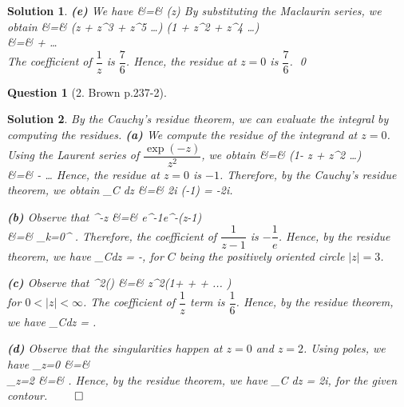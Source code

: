 \documentclass{article} %
\def\eQb#1\eQe{\begin{eqnarray*}#1\end{eqnarray*}}
\theoremstyle{quest}
\newtheorem*{question}{Question}
\newtheorem*{solution}{Solution}
\begin{document}
\begin{solution}
\smallskip

\textbf{(e)}
We have
\eQb
\dfrac{\sinh(z)}{z^4(1-z^2)} &=& \sinh(z) \cdot {} \cdot
{} 
\eQe
By substituting the Maclaurin series, we obtain
\eQb
\dfrac{\sinh(z)}{z^4(1-z^2)} &=&
(z + z^3 + z^5 \dots )
(1 + z^2 + z^4 \dots) \\
&=&  +  \dots \\
\eQe
The coefficient of $\dfrac{1}{z}$ is $\dfrac{7}{6}$. Hence, the residue
at $z = 0$ is $\dfrac{7}{6}$. \qed
\end{solution}


\bigskip

\begin{question}[2. Brown p.237-2]
\end{question}
\begin{solution}
By the Cauchy's residue theorem, we can evaluate the integral by
computing the residues.
\textbf{(a)} We compute the residue of the integrand at $z = 0$. 
Using the Laurent series of $\dfrac{\exp(-z)}{z^2}$, we obtain
\eQb
\dfrac{\exp(-z^2)}{z^2} &=& (1- z + 
z^2 \dots ) \\
&=&  -  \dots
\eQe
Hence, the residue at $z = 0$ is $-1$. Therefore, by the Cauchy's
residue theorem, we obtain
\eQb
\int_{C} dz &=& 2\pi i (-1) = -2\pi i.
\eQe

\smallskip

\textbf{(b)}
Observe that 
\eQb
e^{-z} &=& e^{-1}e^{-(z-1)} \\
&=& \sum_{k=0}^{\infty}  .
\eQe
Therefore, the coefficient of $\dfrac{1}{z-1}$ is $-\dfrac{1}{e}$.
Hence, by the residue theorem, we have
\eQb
\int_{C}dz = -,
\eQe
for $C$ being the positively oriented circle $|z| = 3$. 

\smallskip

\textbf{(c)}
Observe that
\eQb
z^2\exp() &=& z^2(1+ + 
 +  ... ) \\
\eQe
for $0 < |z| < \infty$. The coefficient of $\dfrac{1}{z}$ term is
$\dfrac{1}{6}$. Hence, by the residue theorem, we have
\eQb
\int_{C}dz = .
\eQe
\smallskip

\textbf{(d)} 
Observe that the singularities happen at $z = 0$ and $z = 2$. Using poles,
we have
\eQb
\text{Res}_{z=0} &=&   \\
_{z=2} &=& .
\eQe 
Hence, by the residue theorem, we have
\eQb
\int_{C}  dz = 2\pi i,
\eQe
for the given contour. $\qed$ 

\smallskip

\end{solution}
\end{document}

